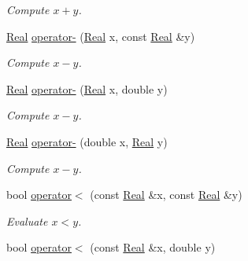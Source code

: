 \begin{DoxyCompactItemize}
\begin{DoxyCompactList}\small\item\em Compute $x+y$. \end{DoxyCompactList}\item 
\hypertarget{namespaceSpacy_a8bc98f51c7beab86185bf97a29b36395}{}\hyperlink{classSpacy_1_1Real}{Real} \hyperlink{namespaceSpacy_a8bc98f51c7beab86185bf97a29b36395}{operator-\/} (\hyperlink{classSpacy_1_1Real}{Real} x, const \hyperlink{classSpacy_1_1Real}{Real} \&y)\label{namespaceSpacy_a8bc98f51c7beab86185bf97a29b36395}

\begin{DoxyCompactList}\small\item\em Compute $x-y$. \end{DoxyCompactList}\item 
\hypertarget{namespaceSpacy_a44f8376365df6626e2a23a8e98006b94}{}\hyperlink{classSpacy_1_1Real}{Real} \hyperlink{namespaceSpacy_a44f8376365df6626e2a23a8e98006b94}{operator-\/} (\hyperlink{classSpacy_1_1Real}{Real} x, double y)\label{namespaceSpacy_a44f8376365df6626e2a23a8e98006b94}

\begin{DoxyCompactList}\small\item\em Compute $x-y$. \end{DoxyCompactList}\item 
\hypertarget{namespaceSpacy_abc7070d9de1fb83d5acabd05b193323e}{}\hyperlink{classSpacy_1_1Real}{Real} \hyperlink{namespaceSpacy_abc7070d9de1fb83d5acabd05b193323e}{operator-\/} (double x, \hyperlink{classSpacy_1_1Real}{Real} y)\label{namespaceSpacy_abc7070d9de1fb83d5acabd05b193323e}

\begin{DoxyCompactList}\small\item\em Compute $x-y$. \end{DoxyCompactList}\item 
\hypertarget{namespaceSpacy_adad234754ecdf722a39b1cc305cac6e8}{}bool \hyperlink{namespaceSpacy_adad234754ecdf722a39b1cc305cac6e8}{operator$<$} (const \hyperlink{classSpacy_1_1Real}{Real} \&x, const \hyperlink{classSpacy_1_1Real}{Real} \&y)\label{namespaceSpacy_adad234754ecdf722a39b1cc305cac6e8}

\begin{DoxyCompactList}\small\item\em Evaluate $ x<y $. \end{DoxyCompactList}\item 
\hypertarget{namespaceSpacy_a1571207720f9eade7a3ebea4a11b2295}{}bool \hyperlink{namespaceSpacy_a1571207720f9eade7a3ebea4a11b2295}{operator$<$} (const \hyperlink{classSpacy_1_1Real}{Real} \&x, double y)\label{namespaceSpacy_a1571207720f9eade7a3ebea4a11b2295}


\end{DoxyCompactItemize}
